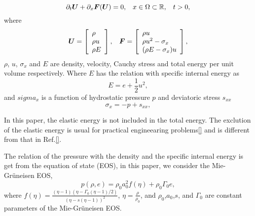 \documentclass{article}
\theoremstyle{plain}\newtheorem{definition}{\sc{Definition}}
\theoremstyle{defination}\newtheorem{example}{Example}[section]
\numberwithin{equation}{section}
\numberwithin{table}{section}
\begin{document}
\begin{equation}
  \partial_t \bm{U} +\partial _x \bm{F}(\bm{U}) = 0, \hspace{0.3cm} x\in \Omega \subset \mathbb{R}, \hspace{0.3cm} t>0,
\end{equation}
where
\begin{equation}
  \bm{U} = \left[ \begin{array}{l}
	  \rho \\
	  \rho u \\
	  \rho  E \\
	\end{array}
  \right],
  \hspace{0.3cm} 
  \bm{F} = \left[ \begin{array}{l}
	  \rho u \\
	  \rho u^2 -\sigma_x\\
	  (\rho E -\sigma_x)u\\
  \end{array} \right],
\end{equation}
$\rho$, $u$, $\sigma_x$ and $E$ are  density, velocity, Cauchy stress and total energy per unit volume respectively. Where $E$ has the relation with specific internal energy as
\begin{equation}
  E = e+\frac{1}{2}u^2,
\end{equation}
and $sigma_x$ is a function of hydrostatic pressure $p$ and deviatoric stress $s_{xx}$
\begin{equation}
  \sigma_x = -p +s_{xx},
\end{equation}

In this paper, the elastic energy is not included in the total energy. The exclution of the elastic energy is usual for practical engineearing problems\ref{} and is different from that in Ref.\ref{}.

The relation of  the pressure with  the density and the specific internal energy is get from the  equation of state (EOS), in this paper, we consider the Mie-Gr\"uneisen EOS,
\begin{equation}
  p(\rho,e) = \rho_0 a_0^2f(\eta)+ \rho_0 \Gamma_0 e,
\end{equation}
where $f(\eta) = \frac{(\eta-1)(\eta-\Gamma_0(\eta-1)/2)}{(\eta-s(\eta-1))^2}$, $\eta = \frac{\rho}{\rho_0}$, and $\rho_0$,$a_0$,$s$, and $\Gamma_0$ are constant parameters of the Mie-Gr\"uneisen EOS.
\end{document}
